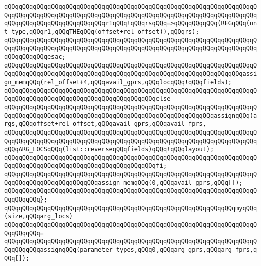 \verb|qQQqqQQqqQQqqQQqqQQqqQQqqQQqqQQqqQQqqQQqqQQqqQQqqQQqqQQqqQQqqQQqqQQqqQQqqQQqqQQqqQQqqQQqqQQqqQQqqQQqqQQqqQQqqQQqqQQqqQQqqQQqqQQqqQQqqQQqqQQqqQQqqQQqqQQqqQQqqQQqqQQqqQQqr1qQQq!qQQqrsqQQq=>qQQqqQQqqQQq(REGqQQq(unt_type,qQQqr1,qQQqTHEqQQq(offset+rel_offset)),qQQqrs);|\newline
\verb|qQQqqQQqqQQqqQQqqQQqqQQqqQQqqQQqqQQqqQQqqQQqqQQqqQQqqQQqqQQqqQQqqQQqqQQqqQQqqQQqqQQqqQQqqQQqqQQqqQQqqQQqqQQqqQQqqQQqqQQqqQQqqQQqqQQqqQQqqQQqqQQqqQQqqQQqesac;|\newline
\newline
\verb|qQQqqQQqqQQqqQQqqQQqqQQqqQQqqQQqqQQqqQQqqQQqqQQqqQQqqQQqqQQqqQQqqQQqqQQqqQQqqQQqqQQqqQQqqQQqqQQqqQQqqQQqqQQqqQQqqQQqqQQqqQQqqQQqqQQqqQQqassign_memqQQq(rel_offset+4,qQQqavail_gprs,qQQqlocqQQq!qQQqfields);|\newline
\newline
\verb|qQQqqQQqqQQqqQQqqQQqqQQqqQQqqQQqqQQqqQQqqQQqqQQqqQQqqQQqqQQqqQQqqQQqqQQqqQQqqQQqqQQqqQQqqQQqqQQqqQQqqQQqqQQqqQQqelse|\newline
\verb|qQQqqQQqqQQqqQQqqQQqqQQqqQQqqQQqqQQqqQQqqQQqqQQqqQQqqQQqqQQqqQQqqQQqqQQqqQQqqQQqqQQqqQQqqQQqqQQqqQQqqQQqqQQqqQQqqQQqqQQqqQQqqQQqassignqQQq(args,qQQqoffset+rel_offset,qQQqavail_gprs,qQQqavail_fprs,|\newline
\verb|qQQqqQQqqQQqqQQqqQQqqQQqqQQqqQQqqQQqqQQqqQQqqQQqqQQqqQQqqQQqqQQqqQQqqQQqqQQqqQQqqQQqqQQqqQQqqQQqqQQqqQQqqQQqqQQqqQQqqQQqqQQqqQQqqQQqqQQqqQQqqQQqARG_LOCSqQQq(list::reverseqQQqfields)qQQq!qQQqlayout);|\newline
\verb|qQQqqQQqqQQqqQQqqQQqqQQqqQQqqQQqqQQqqQQqqQQqqQQqqQQqqQQqqQQqqQQqqQQqqQQqqQQqqQQqqQQqqQQqqQQqqQQqqQQqqQQqqQQqqQQqfi;|\newline
\newline
\verb|qQQqqQQqqQQqqQQqqQQqqQQqqQQqqQQqqQQqqQQqqQQqqQQqqQQqqQQqqQQqqQQqqQQqqQQqqQQqqQQqqQQqqQQqqQQqqQQqassign_memqQQq(0,qQQqavail_gprs,qQQq[]);|\newline
\verb|qQQqqQQqqQQqqQQqqQQqqQQqqQQqqQQqqQQqqQQqqQQqqQQqqQQqqQQqqQQqqQQqqQQqqQQqqQQqqQQq};|\newline
\newline
\verb|qQQqqQQqqQQqqQQqqQQqqQQqqQQqqQQqqQQqqQQqqQQqqQQqqQQqqQQqqQQqqQQqmyqQQq(size,qQQqarg_locs)|\newline
\verb|qQQqqQQqqQQqqQQqqQQqqQQqqQQqqQQqqQQqqQQqqQQqqQQqqQQqqQQqqQQqqQQqqQQqqQQqqQQqqQQq=|\newline
\verb|qQQqqQQqqQQqqQQqqQQqqQQqqQQqqQQqqQQqqQQqqQQqqQQqqQQqqQQqqQQqqQQqqQQqqQQqqQQqqQQqassignqQQq(parameter_types,qQQq0,qQQqarg_gprs,qQQqarg_fprs,qQQq[]);|\newline
